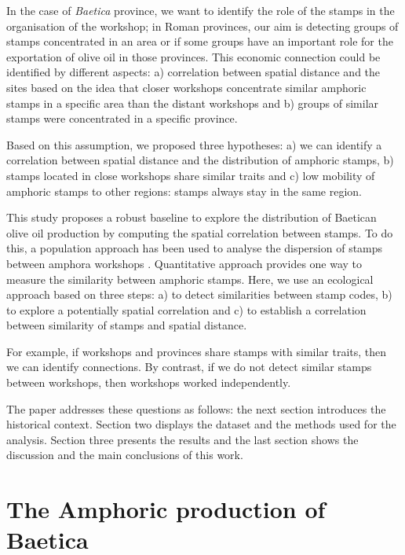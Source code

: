 In the case of \textit{Baetica} province, we want to identify the role of the stamps in the organisation of the workshop; in Roman provinces, our aim is detecting groups of stamps concentrated in an area or if some groups have an important role for the exportation of olive oil in those provinces. This economic connection could be identified by different aspects: a) correlation between spatial distance and the sites based on the idea that closer workshops concentrate similar amphoric stamps in a specific area than the distant workshops and b) groups of similar stamps were concentrated in a specific province. 


Based on this assumption, we proposed three hypotheses: a) we can identify a correlation between spatial distance and the distribution of amphoric stamps, b) stamps located in close workshops share similar traits and c) low mobility of amphoric stamps to other regions: stamps always stay in the same region. 


This study proposes a robust baseline to explore the distribution of Baetican olive oil production by computing the spatial correlation between stamps. To do this, a population approach has been used to analyse the dispersion of stamps between amphora workshops \citep{rubio-campillo_ecology_2018}. Quantitative approach provides one way to measure the similarity between amphoric stamps. Here, we use an ecological approach based on three steps: a) to detect similarities between stamp codes, b) to explore a potentially spatial correlation and c) to establish a correlation between similarity of stamps and spatial distance. 


For example, if workshops and provinces share stamps with similar traits, then we can identify connections. By contrast, if we do not detect similar stamps between workshops, then workshops worked independently. 

The paper addresses these questions as follows: the next section introduces the historical context. Section two displays the dataset and the methods used for the analysis. Section three presents the results and the last section shows the discussion and the main conclusions of this work. 

\section{The Amphoric production of Baetica}
\label{sec:1}

